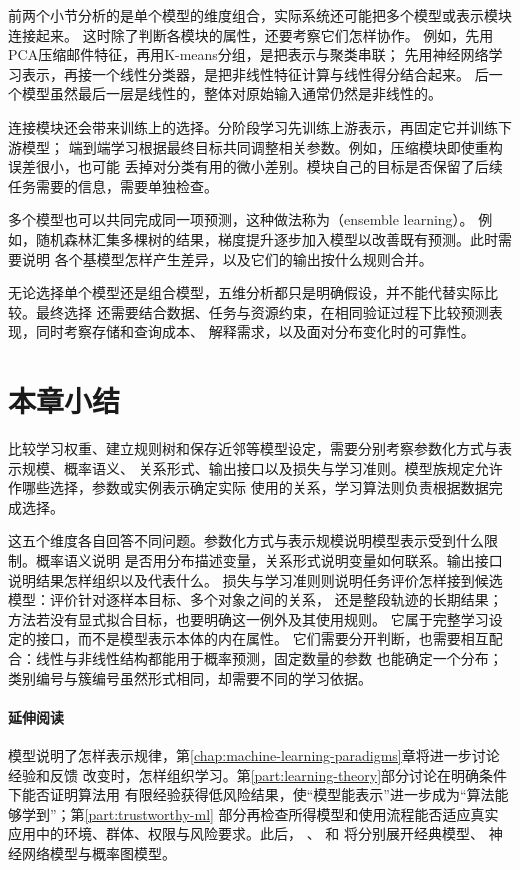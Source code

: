 前两个小节分析的是单个模型的维度组合，实际系统还可能把多个模型或表示模块连接起来。
这时除了判断各模块的属性，还要考察它们怎样协作。
例如，先用PCA压缩邮件特征，再用K-means分组，是把表示与聚类串联；
先用神经网络学习表示，再接一个线性分类器，是把非线性特征计算与线性得分结合起来。
后一个模型虽然最后一层是线性的，整体对原始输入通常仍然是非线性的。

连接模块还会带来训练上的选择。分阶段学习先训练上游表示，再固定它并训练下游模型；
端到端学习根据最终目标共同调整相关参数。例如，压缩模块即使重构误差很小，也可能
丢掉对分类有用的微小差别。模块自己的目标是否保留了后续任务需要的信息，需要单独检查。

多个模型也可以共同完成同一项预测，这种做法称为（ensemble learning）。
例如，随机森林汇集多棵树的结果，梯度提升逐步加入模型以改善既有预测。此时需要说明
各个基模型怎样产生差异，以及它们的输出按什么规则合并。

无论选择单个模型还是组合模型，五维分析都只是明确假设，并不能代替实际比较。最终选择
还需要结合数据、任务与资源约束，在相同验证过程下比较预测表现，同时考察存储和查询成本、
解释需求，以及面对分布变化时的可靠性。

\section{本章小结}
\label{sec:models-summary}

比较学习权重、建立规则树和保存近邻等模型设定，需要分别考察参数化方式与表示规模、概率语义、
关系形式、输出接口以及损失与学习准则。模型族规定允许作哪些选择，参数或实例表示确定实际
使用的关系，学习算法则负责根据数据完成选择。

这五个维度各自回答不同问题。参数化方式与表示规模说明模型表示受到什么限制。概率语义说明
是否用分布描述变量，关系形式说明变量如何联系。输出接口说明结果怎样组织以及代表什么。
损失与学习准则则说明任务评价怎样接到候选模型：评价针对逐样本目标、多个对象之间的关系，
还是整段轨迹的长期结果；方法若没有显式拟合目标，也要明确这一例外及其使用规则。
它属于完整学习设定的接口，而不是模型表示本体的内在属性。
它们需要分开判断，也需要相互配合：线性与非线性结构都能用于概率预测，固定数量的参数
也能确定一个分布；类别编号与簇编号虽然形式相同，却需要不同的学习依据。

\paragraph{延伸阅读}

模型说明了怎样表示规律，第\ref{chap:machine-learning-paradigms}章将进一步讨论经验和反馈
改变时，怎样组织学习。第\ref{part:learning-theory}部分讨论在明确条件下能否证明算法用
有限经验获得低风险结果，使“模型能表示”进一步成为“算法能够学到”；第\ref{part:trustworthy-ml}
部分再检查所得模型和使用流程能否适应真实应用中的环境、群体、权限与风险要求。此后，
、
和
将分别展开经典模型、
神经网络模型与概率图模型。
